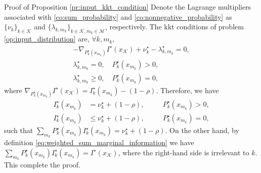 \documentclass[journal,12pt,onecolumn,draftclsnofoot]{IEEEtran}
\theoremstyle{remark}
\begin{document}
\begin{appendix}
	\begin{subsection}{Proof of Proposition \ref{pr:input_kkt_condition}}
		Denote the Lagrange multipliers associated with \eqref{co:sum_probability} and \eqref{co:nonnegative_probability} as $\{\nu_k\}_{k \in \mathcal{K}}$ and $\{\lambda_{k,m_k}\}_{k \in \mathcal{K},m_k \in \mathcal{M}}$, respectively.
		The \gls{kkt} conditions of problem \eqref{op:input_distribution} are, $\forall k,m_k$,
		\begin{subequations}
			\label{eq:input_kkt_condition_original}
			\begin{gather}
				- \nabla_{P_k^\star(x_{m_k})} I^\star(x_{\mathcal{K}}) + \nu_k^\star - \lambda_{k,m_k}^\star = 0, \\
				\lambda_{k,m_k}^\star = 0, \quad P_k^\star(x_{m_k}) > 0, \\
				\lambda_{k,m_k}^\star \ge 0, \quad P_k^\star(x_{m_k}) = 0,
			\end{gather}
		\end{subequations}
		where $\nabla_{P_k^\star(x_{m_k})} I^\star(x_{\mathcal{K}}) = I_k^\star(x_{m_k}) - (1 - \rho)$.
		Therefore, we have
		\begin{subequations}
			\label{eq:input_kkt_condition_transformed}
			\begin{alignat}{2}
				I_k^\star(x_{m_k}) & = \nu_k^\star + (1 - \rho), \quad   &  & P_k^\star(x_{m_k}) > 0,\label{eq:probable_states_marginal} \\
				I_k^\star(x_{m_k}) & \le \nu_k^\star + (1 - \rho), \quad &  & P_k^\star(x_{m_k}) = 0,\label{eq:dropped_states_marginal}
			\end{alignat}
		\end{subequations}
		such that $\sum_{m_k} P_k^\star(x_{m_k}) I_k^\star(x_{m_k}) = \nu_k^\star + (1 - \rho)$.
		On the other hand, by definition \eqref{eq:weighted_sum_marginal_information} we have $\sum_{m_k} P_k^\star(x_{m_k}) I_k^\star(x_{m_k}) = I^\star(x_{\mathcal{K}})$, where the right-hand side is irrelevant to $k$.
		This complete the proof.
		\label{ap:input_kkt_condition}
	\end{subsection}


\end{appendix}
\end{document}
